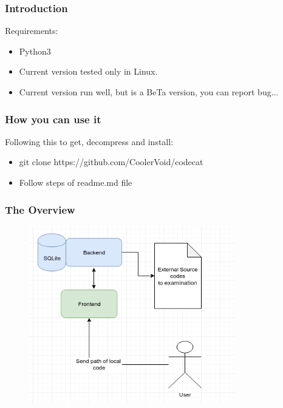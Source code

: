\documentclass[serif,mathserif]{beamer}
\begin{document}
\begin{frame}
  \frametitle{Introduction}
  Requirements:
  \begin{itemize}
  \item  Python3 
  \item  Current version tested only in Linux.
  \item  Current version run well, but is a BeTa version, you can report bug...
  \end{itemize}
\end{frame}


\begin{frame}
  \frametitle{How you can use it}
  Following this to get, decompress and install:
  \begin{itemize}
  \item git clone https://github.com/CoolerVoid/codecat
  \item Follow steps of readme.md file
  \end{itemize}
\end{frame}



\begin{frame}
  \frametitle{The Overview}
  \begin{figure}[]    
    \centering
    \includegraphics[width=9cm]{images/diagram0.png} 
  \end{figure}
\end{frame}
\end{document}
